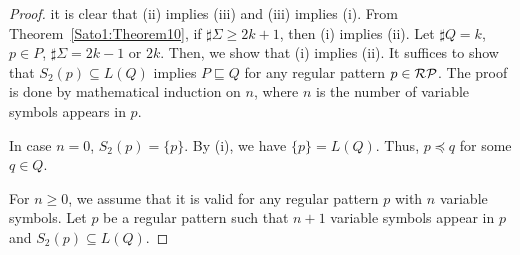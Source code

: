 \begin{proof}
    it is clear that (ii) implies (iii) and (iii) implies (i).
    From Theorem~\ref{Sato1:Theorem10}, %
    if $\sharp\Sigma \geq 2k+1$, then
    (i) implies (ii).
    Let $\sharp Q = k$, $p \in P$, $\sharp\Sigma = 2k-1$ or $2k$.
    Then, we show that (i) implies (ii).
    It suffices to show that $S_{2}(p) \subseteq L(Q)$ implies $P \sqsubseteq Q$
    for any regular pattern $p \in \mathcal{RP}$.
    The proof is done by mathematical induction on $n$, where $n$ is the number of variable symbols appears in $p$.


    In case $n=0$, $S_{2}(p) = \{p\}$.
    By (i), we have $\{p\} = L(Q)$. Thus, $p \preceq q$ for some $q \in Q$.

    For $n \geq 0$,
    we assume that it is valid for any regular pattern $p$
    with $n$ variable symbols.
    Let $p$ be a regular pattern such that $n+1$ variable symbols appear in $p$
    and $S_{2}(p) \subseteq L(Q)$.


\end{proof}
